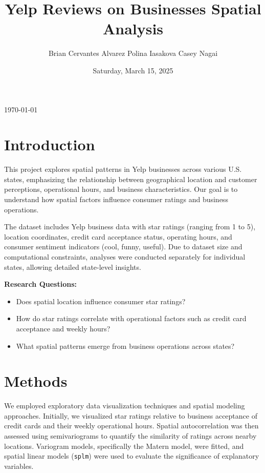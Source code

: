 \documentclass[
  12pt,
  letterpaper,
  DIV=11,
  numbers=noendperiod]{scrartcl}
\title{Yelp Reviews on Businesses Spatial Analysis}
\author{Brian Cervantes Alvarez \textbar{} Polina Iasakova \textbar{}
Casey Nagai}
\date{Saturday, March 15, 2025}
\makeatletter
\providecommand{\tightlist}{%
  \setlength{\itemsep}{0pt}\setlength{\parskip}{0pt}}\usepackage{longtable,booktabs,array}
\renewcommand{\maketitle}{
    \bgroup
    \begin{flushleft}
        \begin{spacing}{1.25}
        {\sffamily\fontsize{25}{20}\textbf{\capitalisewords{\@title}}} \vspace{0.3cm} \newline
        {\large\@author} \newline
        {\large\today} \newline %
        {\large {\@subtitle}} \vspace{-1cm}
        \end{spacing} %
    \end{flushleft}
    \egroup
}
\makeatother
\begin{document}
\maketitle

\pagestyle{mystyle}


\section{Introduction}\label{introduction}

This project explores spatial patterns in Yelp businesses across various
U.S. states, emphasizing the relationship between geographical location
and customer perceptions, operational hours, and business
characteristics. Our goal is to understand how spatial factors influence
consumer ratings and business operations.

The dataset includes Yelp business data with star ratings (ranging from
1 to 5), location coordinates, credit card acceptance status, operating
hours, and consumer sentiment indicators (cool, funny, useful). Due to
dataset size and computational constraints, analyses were conducted
separately for individual states, allowing detailed state-level
insights.

\textbf{Research Questions:}

\begin{itemize}
\tightlist
\item
  Does spatial location influence consumer star ratings?
\item
  How do star ratings correlate with operational factors such as credit
  card acceptance and weekly hours?
\item
  What spatial patterns emerge from business operations across states?
\end{itemize}

\section{Methods}\label{methods}

We employed exploratory data visualization techniques and spatial
modeling approaches. Initially, we visualized star ratings relative to
business acceptance of credit cards and their weekly operational hours.
Spatial autocorrelation was then assessed using semivariograms to
quantify the similarity of ratings across nearby locations. Variogram
models, specifically the Matern model, were fitted, and spatial linear
models (\texttt{splm}) were used to evaluate the significance of
explanatory variables.
\end{document}
